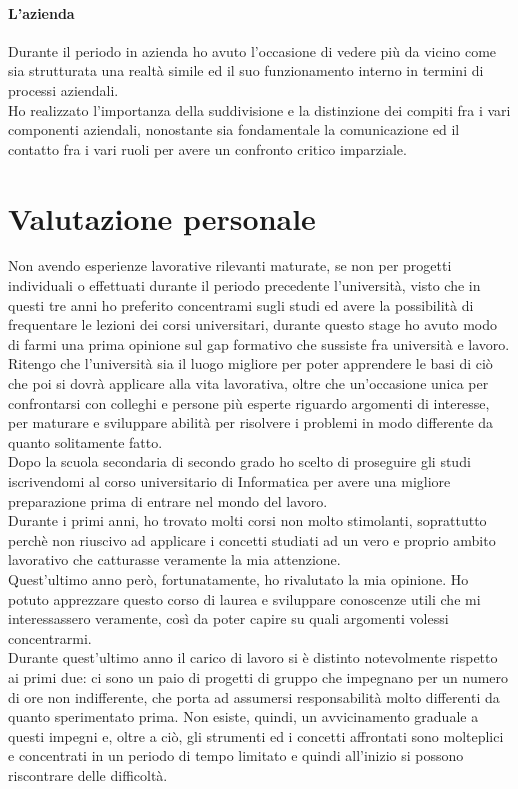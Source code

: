 \newpage
\paragraph{L'azienda}
Durante il periodo in azienda ho avuto l'occasione di vedere più da vicino come sia strutturata una realtà simile ed il suo funzionamento interno in termini di processi aziendali. \\
Ho realizzato l'importanza della suddivisione e la distinzione dei compiti fra i vari componenti aziendali, nonostante sia fondamentale la comunicazione ed il contatto fra i vari ruoli per avere un confronto critico imparziale.

\section{Valutazione personale}
Non avendo esperienze lavorative rilevanti maturate, se non per progetti individuali o effettuati durante il periodo precedente l'università, visto che in questi tre anni ho preferito concentrami sugli studi ed avere la possibilità di frequentare le lezioni dei corsi universitari, durante questo stage ho avuto modo di farmi una prima opinione sul gap formativo che sussiste fra università e lavoro. \\ 
Ritengo che l'università sia il luogo migliore per poter apprendere le basi di ciò che poi si dovrà applicare alla vita lavorativa, oltre che un'occasione unica per confrontarsi con colleghi e persone più esperte riguardo argomenti di interesse, per maturare e sviluppare abilità per risolvere i problemi in modo differente da quanto solitamente fatto. \\ 
Dopo la scuola secondaria di secondo grado ho scelto di proseguire gli studi iscrivendomi al corso universitario di Informatica per avere una migliore preparazione prima di entrare nel mondo del lavoro. \\
Durante i primi anni, ho trovato molti corsi non molto stimolanti, soprattutto perchè non riuscivo ad applicare i concetti studiati ad un vero e proprio ambito lavorativo che catturasse veramente la mia attenzione. \\ 
Quest'ultimo anno però, fortunatamente, ho rivalutato la mia opinione. Ho potuto apprezzare questo corso di laurea e sviluppare conoscenze utili che mi interessassero veramente, così da poter capire su quali argomenti volessi concentrarmi. \\
Durante quest'ultimo anno il carico di lavoro si è distinto notevolmente rispetto ai primi due: ci sono un paio di progetti di gruppo che impegnano per un numero di ore non indifferente, che porta ad assumersi responsabilità molto differenti da quanto sperimentato prima. Non esiste, quindi, un avvicinamento graduale a questi impegni e, oltre a ciò, gli strumenti ed i concetti affrontati sono molteplici e concentrati in un periodo di tempo limitato e quindi all'inizio si possono riscontrare delle difficoltà. \\
